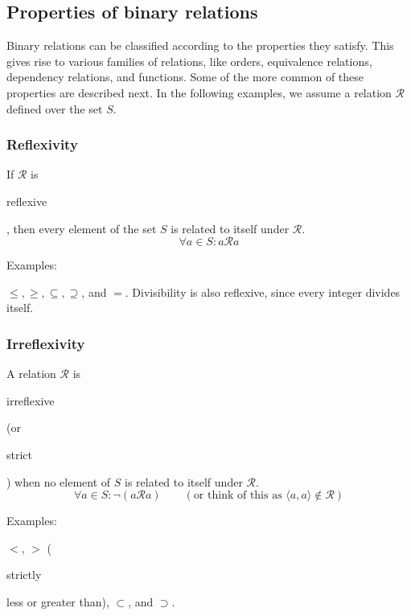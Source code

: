 \documentclass[11pt]{article}
\theoremstyle{plain}
\theoremstyle{definition}
\begin{document}
\subsection*{Properties of binary relations}

Binary relations can be classified according to the properties they satisfy.
This gives rise to various families of relations, like orders, equivalence relations, dependency relations, and functions. Some of the more common of these properties are described next.
In the following examples, we assume a relation $ \mathcal{R} $ defined over the set $ S $.

\subsubsection*{ Reflexivity}

If $ \mathcal{R} $ is \begin{em}reflexive\end{em}, then every element of the set $ S $ is related to itself under $ \mathcal{R} $.
\begin{displaymath}
  \forall a \in S : a\mathcal{R}a
\end{displaymath}

\noindent \begin{em}Examples:\end{em} $ \le, \ge, \subseteq, \supseteq $, and $ = $. Divisibility is also reflexive, since every integer divides itself.

\subsubsection*{ Irreflexivity}

A relation $ \mathcal{R} $ is \begin{em}irreflexive\end{em} (or \begin{em}strict\end{em}) when no element of $ S $ is related to itself under $ \mathcal{R} $. %
\begin{displaymath}
  \forall a \in S : \neg(a\mathcal{R}a) \quad \quad (\text{or think of this as } \langle a, a \rangle \notin \mathcal{R} )
\end{displaymath}

\noindent \begin{em}Examples:\end{em} $ < $, $ > $ (\begin{em}strictly\end{em} less or greater than), $ \subset $, and $ \supset $.
\end{document}
